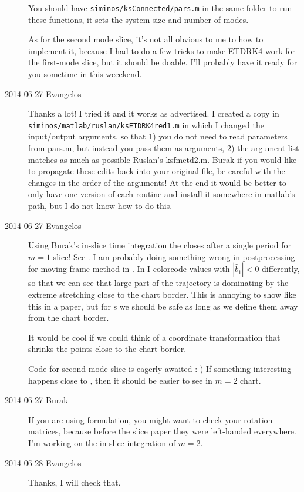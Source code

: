 \begin{description}
You should have \texttt{siminos/ksConnected/pars.m} in the same folder to run these
functions, it sets the system size and number of modes.

As for the second mode slice, it's not all obvious to me to how to implement
it, because I had to do a few tricks to make ETDRK4 work for the first-mode slice,
but it should be doable. I'll probably have it ready for you sometime in this
weeekend.

\item[2014-06-27 Evangelos] Thanks a lot! I tried it and it works as advertised.
I created a copy in \texttt{siminos/matlab/ruslan/ksETDRK4red1.m} in which I changed
the input/output arguments, so that 1) you do not need to read parameters from pars.m,
but instead you pass them as arguments, 2) the argument list matches as much as possible
Ruslan's ksfmetd2.m. Burak if you would like to propagate these edits back into your
original file, be careful with the changes in the order of the arguments!
At the end it would be better to only have one version of each routine and
install it somewhere in matlab's path, but I do not know how to do this.

\item[2014-06-27 Evangelos] Using Burak's in-slice time integration the  closes after
a single period for $m=1$ slice! See .
I am probably doing something wrong in postprocessing for moving frame method in .
In 
I colorcode values with $|\hat{b}_1|<0$ differently, so that we can see that large part of the trajectory
is dominating by the extreme stretching close to the chart border. This is annoying to show like
this in a paper, but for \PoincSec s we should be safe as long as we define them
away from the chart border.

It would be cool if we could think of a coordinate transformation
that shrinks the points close to the chart border.

Code for second mode slice is eagerly awaited :-) If something
interesting happens close to , then it should be easier to see in
$m=2$ chart.

\item[2014-06-27 Burak] If you are using  formulation, you might want
to check your rotation matrices, because before the slice paper they were
left-handed everywhere. I'm working on the in slice integration of $m=2$.

\item[2014-06-28 Evangelos] Thanks, I will check that.


\end{description}
